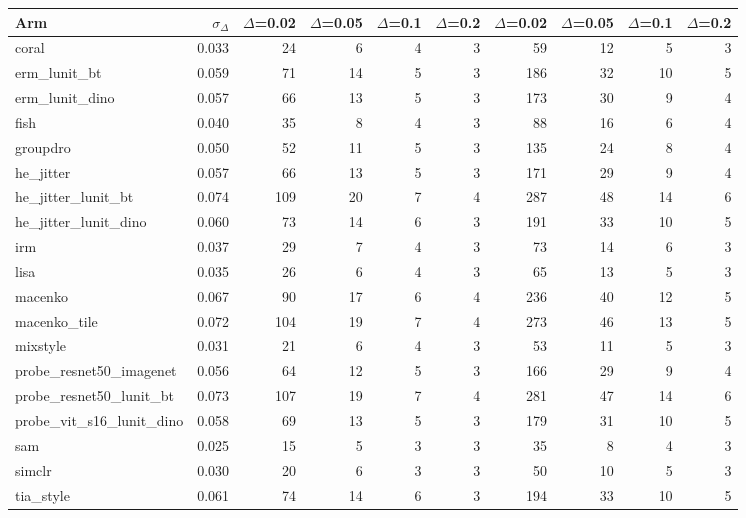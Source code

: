 \begin{tabular}{lrrrrrrrrr}
\toprule
Arm & $\sigma_\Delta$ & $\Delta$=0.02 & $\Delta$=0.05 & $\Delta$=0.1 & $\Delta$=0.2 & $\Delta$=0.02 & $\Delta$=0.05 & $\Delta$=0.1 & $\Delta$=0.2 \\
\midrule
coral & 0.033 & 24 & 6 & 4 & 3 & 59 & 12 & 5 & 3 \\
erm\_lunit\_bt & 0.059 & 71 & 14 & 5 & 3 & 186 & 32 & 10 & 5 \\
erm\_lunit\_dino & 0.057 & 66 & 13 & 5 & 3 & 173 & 30 & 9 & 4 \\
fish & 0.040 & 35 & 8 & 4 & 3 & 88 & 16 & 6 & 4 \\
groupdro & 0.050 & 52 & 11 & 5 & 3 & 135 & 24 & 8 & 4 \\
he\_jitter & 0.057 & 66 & 13 & 5 & 3 & 171 & 29 & 9 & 4 \\
he\_jitter\_lunit\_bt & 0.074 & 109 & 20 & 7 & 4 & 287 & 48 & 14 & 6 \\
he\_jitter\_lunit\_dino & 0.060 & 73 & 14 & 6 & 3 & 191 & 33 & 10 & 5 \\
irm & 0.037 & 29 & 7 & 4 & 3 & 73 & 14 & 6 & 3 \\
lisa & 0.035 & 26 & 6 & 4 & 3 & 65 & 13 & 5 & 3 \\
macenko & 0.067 & 90 & 17 & 6 & 4 & 236 & 40 & 12 & 5 \\
macenko\_tile & 0.072 & 104 & 19 & 7 & 4 & 273 & 46 & 13 & 5 \\
mixstyle & 0.031 & 21 & 6 & 4 & 3 & 53 & 11 & 5 & 3 \\
probe\_resnet50\_imagenet & 0.056 & 64 & 12 & 5 & 3 & 166 & 29 & 9 & 4 \\
probe\_resnet50\_lunit\_bt & 0.073 & 107 & 19 & 7 & 4 & 281 & 47 & 14 & 6 \\
probe\_vit\_s16\_lunit\_dino & 0.058 & 69 & 13 & 5 & 3 & 179 & 31 & 10 & 5 \\
sam & 0.025 & 15 & 5 & 3 & 3 & 35 & 8 & 4 & 3 \\
simclr & 0.030 & 20 & 6 & 3 & 3 & 50 & 10 & 5 & 3 \\
tia\_style & 0.061 & 74 & 14 & 6 & 3 & 194 & 33 & 10 & 5 \\
\bottomrule
\end{tabular}
